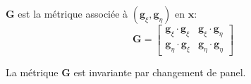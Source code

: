 \begin{definition}
$\mathbf{G}$ est la métrique associée à $(\mathbf{g}_{\xi}, \mathbf{g}_{\eta})$ en $\mathbf{x}$:
\begin{equation}
\mathbf{G} = \begin{bmatrix}
\mathbf{g}_{\xi} \cdot \mathbf{g}_{\xi} & \mathbf{g}_{\xi} \cdot \mathbf{g}_{\eta} \\
\mathbf{g}_{\eta} \cdot \mathbf{g}_{\xi} & \mathbf{g}_{\eta} \cdot \mathbf{g}_{\eta}
\end{bmatrix}
\end{equation}
\end{definition}

\begin{proposition}
La métrique $\mathbf{G}$ est invariante par changement de panel.
\end{proposition}

